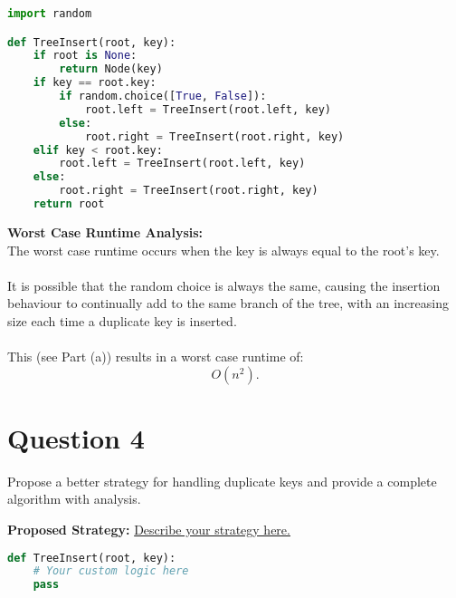 \documentclass[12pt]{article}
\begin{document}
\begin{lstlisting}[language=Python, caption={TreeInsert with Randomized Insertion}]
import random

def TreeInsert(root, key):
    if root is None:
        return Node(key)
    if key == root.key:
        if random.choice([True, False]):
            root.left = TreeInsert(root.left, key)
        else:
            root.right = TreeInsert(root.right, key)
    elif key < root.key:
        root.left = TreeInsert(root.left, key)
    else:
        root.right = TreeInsert(root.right, key)
    return root
\end{lstlisting}
\textbf{Worst Case Runtime Analysis:} \\
The worst case runtime occurs when the key is always equal to the root's key. \\
\\
It is possible that the random choice is always the same, causing the insertion behaviour to continually add to the same branch of the tree, with an increasing size each time a duplicate key is inserted. \\
\\
This (see Part (a)) results in a worst case runtime of:
\[
    O(n^2) \text{.}
\]

\pagebreak

\section*{Question 4}
Propose a better strategy for handling duplicate keys and provide a complete algorithm with analysis.

\vspace{1em} %
\textbf{Proposed Strategy:} \underline{Describe your strategy here.}

\begin{lstlisting}[language=Python, caption={Proposed TreeInsert Algorithm}]
def TreeInsert(root, key):
    # Your custom logic here
    pass
\end{lstlisting}
\end{document}
